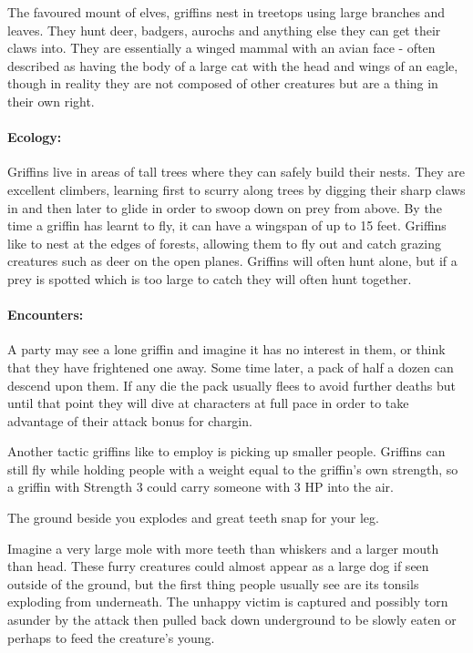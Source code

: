 The favoured mount of elves, griffins nest in treetops using large branches and leaves.  They hunt deer, badgers, aurochs and anything else they can get their claws into.  They are essentially a winged mammal with an avian face - often described as having the body of a large cat with the head and wings of an eagle, though in reality they are not composed of other creatures but are a thing in their own right.

\paragraph{Ecology:} Griffins live in areas of tall trees where they can safely build their nests.  They are excellent climbers, learning first to scurry along trees by digging their sharp claws in and then later to glide in order to swoop down on prey from above.  By the time a griffin has learnt to fly, it can have a wingspan of up to 15 feet.  Griffins like to nest at the edges of forests, allowing them to fly out and catch grazing creatures such as deer on the open planes.  Griffins will often hunt alone, but if a prey is spotted which is too large to catch  they will often hunt together.

\paragraph{Encounters:} A party may see a lone griffin and imagine it has no interest in them, or think that they have frightened one away.  Some time later, a pack of half a dozen can descend upon them.  If any die the pack usually flees to avoid further deaths but until that point they will dive at characters at full pace in order to take advantage of their attack bonus for chargin.

Another tactic griffins like to employ is picking up smaller people.  Griffins can still fly while holding people with a weight equal to the griffin's own strength, so a griffin with Strength 3 could carry someone with 3 HP into the air.

\label{mouthdigger}
\mouthdigger


\begin{boxtext}

	The ground beside you explodes and great teeth snap for your leg.

\end{boxtext}

Imagine a very large mole with more teeth than whiskers and a larger mouth than head.  These furry creatures could almost appear as a large dog if seen outside of the ground, but the first thing people usually see are its tonsils exploding from underneath.  The unhappy victim is captured and possibly torn asunder by the attack then pulled back down underground to be slowly eaten or perhaps to feed the creature's young.

